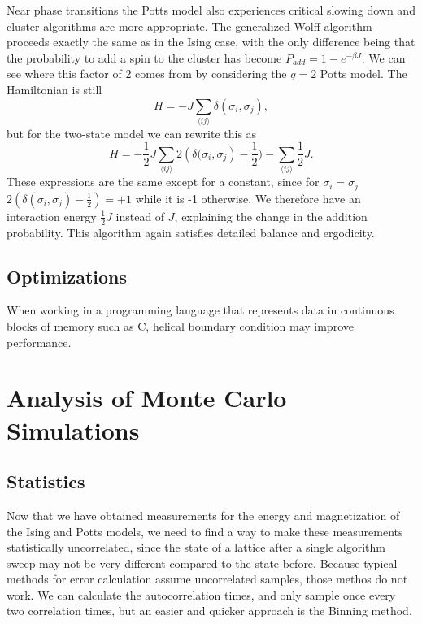 \documentclass[11pt, a4paper]{report} %
\begin{document}
Near phase transitions the Potts model also experiences critical slowing down and cluster algorithms are more appropriate.
The generalized Wolff algorithm proceeds exactly the same as in the Ising case, with the only difference being that the probability to add a spin to the cluster has become \(P_{add} = 1 - e^{-\beta J}\).
We can see where this factor of 2 comes from by considering the \(q=2\) Potts model.
The Hamiltonian is still
\begin{equation}
	H = -J\sum_{\langle i j \rangle} \delta(\sigma_i, \sigma_j),
\end{equation}
but for the two-state model we can rewrite this as
\begin{equation}
	H = -\frac{1}{2} J \sum_{\langle i j \rangle} 2 \left(\delta(\sigma_i, \sigma_j\right) - \frac{1}{2}) - \sum_{\langle i j \rangle} \frac{1}{2}J.
\end{equation}
These expressions are the same except for a constant, since for \(\sigma_i = \sigma_j\) \(2 (\delta(\sigma_i, \sigma_j) - \frac{1}{2}) = +1\) while it is -1 otherwise.
We therefore have an interaction energy \(\frac{1}{2}J\) instead of \(J\), explaining the change in the addition probability.
This algorithm again satisfies detailed balance and ergodicity.\cite{newman:1999}



\section{Optimizations}
When working in a programming language that represents data in continuous blocks of memory such as C, helical boundary condition may improve performance.


\chapter{Analysis of Monte Carlo Simulations}
\section{Statistics}
Now that we have obtained measurements for the energy and magnetization of the Ising and Potts models, we need to find a way to make these measurements statistically uncorrelated, since the state of a lattice after a single algorithm sweep may not be very different compared to the state before.
Because typical methods for error calculation assume uncorrelated samples, those methos do not work.
We can calculate the autocorrelation times, and only sample once every two correlation times, but an easier and quicker approach is the Binning method.
\end{document}
